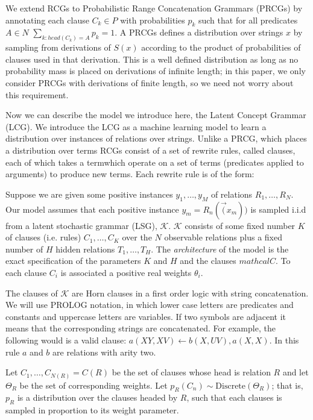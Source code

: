 \documentclass{article}
\begin{document}
We extend RCGs to Probabilistic Range Concatenation Grammars (PRCGs)
by annotating each clause $C_k \in P$ with probabilities $p_k$ such
that for all predicates $A \in N$ $\sum_{k:head(C_k)=A} p_k = 1$. A
PRCGs defines a distribution over strings $x$ by sampling from
derivations of $S(x)$ according to the product of probabilities of
clauses used in that derivation. This is a well defined distribution
as long as no probability mass is placed on derivations of infinite
length; in this paper, we only consider PRCGs with derivations of
finite length, so we need not worry about this requirement.

Now we can describe the model we introduce here, the Latent Concept
Grammar (LCG). We introduce the LCG as a machine learning model to
learn a distribution over instances of relations over strings. Unlike
a PRCG, which places a distribution over terms RCGs consist of a set
of rewrite rules, called clauses, each of which takes a termwhich
operate on a set of terms (predicates applied to arguments) to produce
new terms. Each rewrite rule is of the form:

Suppose we are given some positive instances $y_1, \dots,
y_M$ of relations $R_1, \dots, R_N$. Our model assumes that each
positive instance $y_m=R_n(\vec(x_m))$ is sampled i.i.d from a latent
stochastic grammar (LSG), $\mathcal{K}$. $\mathcal{K}$ consists of
some fixed number $K$ of clauses (i.e. rules) $C_1, \dots, C_K$ over
the $N$ observable relations plus a fixed number of $H$ hidden
relations $T_1, \dots, T_H$. The \emph{architecture} of the model is
the exact specification of the parameters $K$ and $H$ and the clauses
$mathcal{C}$. To each clause $C_i$ is associated a positive real
weights $\theta_i$.

The clauses of $\mathcal{K}$ are Horn clauses in a first order logic
with string concatenation. We will use PROLOG notation, in which lower
case letters are predicates and constants and uppercase letters are
variables. If two symbols are adjacent it means that the corresponding
strings are concatenated. For example, the following would is a valid
clause: $a(XY, XV) \leftarrow b(X, UV), a(X, X)$. In this rule $a$ and
$b$ are relations with arity two.

Let $C_1, \dots, C_{N(R)} = C(R)$ be the set of clauses whose head is
relation $R$ and let $\Theta_R$ be the set of corresponding
weights. Let $p_R(C_n) \sim \text{Discrete}(\Theta_R)$; that is, $p_R$
is a distribution over the clauses headed by $R$, such that each
clauses is sampled in proportion to its weight parameter.
\end{document}
